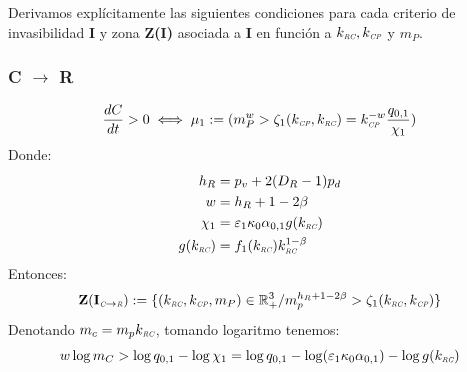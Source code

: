 Derivamos expl\'icitamente las siguientes condiciones para cada criterio de invasibilidad \textbf{I} y zona \textbf{Z(I)} asociada a \textbf{I} en funci\'on a $k_{\textit{\tiny RC}},k_{\textit{\tiny CP}}$ y $m_P$.

\subsubsection{C $\to$ R}

\begin{equation}
  \frac{dC}{dt} > 0 \iff  \mu_1 := (m_P^w > \zeta_1(k_{\textit{\tiny CP}},k_{\textit{\tiny RC}}) = k_{\textit{\tiny CP}}^{-w}\frac{q_{0,1}}{\chi_1})
\end{equation}
Donde:
\begin{equation}
  \begin{aligned}
    h_R &= p_v + 2(D_R - 1)p_d \\
    w &= h_R + 1 - 2 \beta \\
    \chi_1 &= \varepsilon_1 \kappa_0\alpha_{0,1} g(k_{\textit{\tiny RC}}) \\
    g(k_{\textit{\tiny RC}}) &= f_1(k_{\textit{\tiny RC}})k_{\textit{\tiny RC}}^{1-\beta}\\
  \end{aligned}
\end{equation}
Entonces:
\begin{equation}
\mathbf{Z(I_{\textit{\tiny C}\to \textit{\tiny R}})} := \{ (k_{\textit{\tiny RC}},k_{\textit{\tiny CP}},m_P) \in \mathbb{R}^3_+ / m_p^{h_R + 1 - 2\beta} > \zeta_1(k_{\textit{\tiny RC}},k_{\textit{\tiny CP}}) \}
\end{equation}
Denotando $m_c = m_pk_{\textit{\tiny RC}}$, tomando logaritmo tenemos:
\begin{equation}\label{eq:CONDIC-RLog}
 w \log m_C > \log{q_{0,1}} - \log \chi_1 = \log{q_{0,1}} -\log(\varepsilon_1\kappa_0 \alpha_{0,1}) - \log{g(k_{\textit{\tiny RC}})} 
\end{equation}

